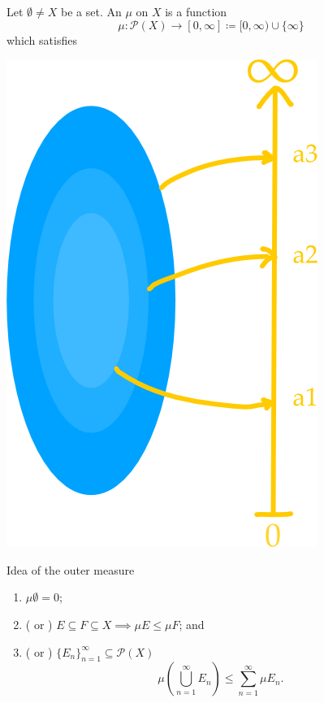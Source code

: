 \documentclass[notoc,notitlepage]{tufte-book}
\begin{document}
\begin{defn}\label{defn:outer_measure}
  Let $\emptyset \neq X$ be a set. An  $\mu$ on $X$ is a
  function
  \begin{equation*}
    \mu : \mathcal{P}(X) \to [0, \infty] \coloneqq [0, \infty) \cup \{ \infty \}
  \end{equation*}
  which satisfies
  \begin{marginfigure}
    \centering
    \includegraphics[width=0.8\marginparwidth]{images/outermeasure.png}
    \caption{Idea of the outer measure}\label{fig:idea_of_the_outer_measure}
  \end{marginfigure}
  \begin{enumerate}
    \item $\mu \emptyset = 0$;
    \item ( or ) $E \subseteq F
      \subseteq X \implies \mu E \leq \mu F$; and
    \item ( or
      ) $\{ E_n \}_{n=1}^{\infty} \subseteq
      \mathcal{P}(X)$
       \begin{equation*}
        \mu \left( \bigcup_{n=1}^{\infty} E_n \right) \leq \sum_{n=1}^{\infty}
        \mu E_n.
      \end{equation*}
  \end{enumerate}
\end{defn}
\end{document}
